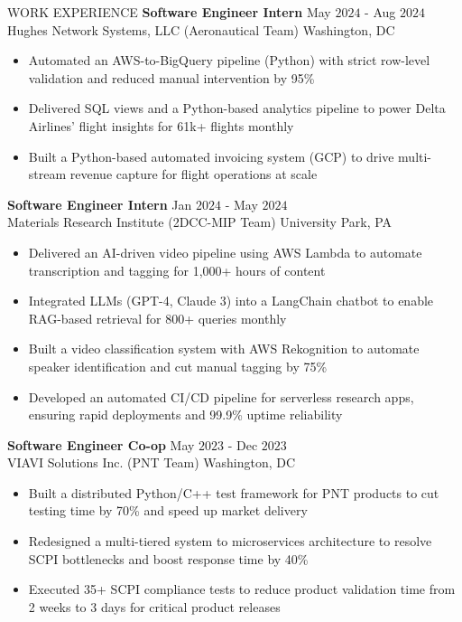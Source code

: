 \documentclass{resume} %
\begin{document}
\begin{rSection}{WORK EXPERIENCE}
{\bf Software Engineer Intern} \hfill May $2024$ - Aug $2024$\\
Hughes Network Systems, LLC (Aeronautical Team) \hfill Washington, DC
\begin{itemize}[itemsep = -4pt]
    \item Automated an AWS-to-BigQuery pipeline (Python) with strict row-level validation and reduced manual intervention by 95\%
    \item Delivered SQL views and a Python-based analytics pipeline to power Delta Airlines' flight insights for 61k+ flights monthly
    \item Built a Python-based automated invoicing system (GCP) to drive multi-stream revenue capture for flight operations at scale
\end{itemize}

{\bf Software Engineer Intern} \hfill Jan $2024$ - May $2024$\\
Materials Research Institute (2DCC-MIP Team) \hfill University Park, PA
\begin{itemize}[itemsep = -4pt]
    \item Delivered an AI-driven video pipeline using AWS Lambda to automate transcription and tagging for 1,000+ hours of content
    \item Integrated LLMs (GPT-4, Claude 3) into a LangChain chatbot to enable RAG-based retrieval for 800+ queries monthly
    \item Built a video classification system with AWS Rekognition to automate speaker identification and cut manual tagging by 75\%
    \item Developed an automated CI/CD pipeline for serverless research apps, ensuring rapid deployments and 99.9\% uptime reliability
\end{itemize}

{\bf Software Engineer Co-op} \hfill May $2023$ - Dec $2023$\\
VIAVI Solutions Inc. (PNT Team) \hfill Washington, DC
\begin{itemize}[itemsep = -4pt]
    \item Built a distributed Python/C++ test framework for PNT products to cut testing time by 70\% and speed up market delivery
    \item Redesigned a multi-tiered system to microservices architecture to resolve SCPI bottlenecks and boost response time by 40\%
    \item Executed 35+ SCPI compliance tests to reduce product validation time from 2 weeks to 3 days for critical product releases
\end{itemize}


\end{rSection}
\end{document}
